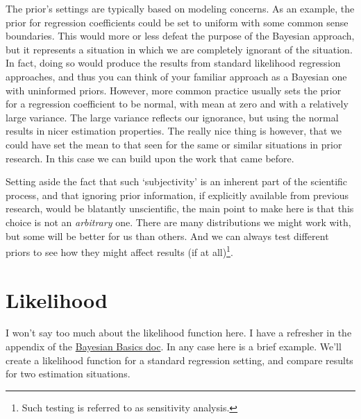 \documentclass[]{book}
\let\rmarkdownfootnote\footnote%
\def\footnote{\protect\rmarkdownfootnote}
\begin{document}
The prior's settings are typically based on modeling concerns. As an
example, the prior for regression coefficients could be set to uniform
with some common sense boundaries. This would more or less defeat the
purpose of the Bayesian approach, but it represents a situation in which
we are completely ignorant of the situation. In fact, doing so would
produce the results from standard likelihood regression approaches, and
thus you can think of your familiar approach as a Bayesian one with
uninformed priors. However, more common practice usually sets the prior
for a regression coefficient to be normal, with mean at zero and with a
relatively large variance. The large variance reflects our ignorance,
but using the normal results in nicer estimation properties. The really
nice thing is however, that we could have set the mean to that seen for
the same or similar situations in prior research. In this case we can
build upon the work that came before.

Setting aside the fact that such `subjectivity' is an inherent part of
the scientific process, and that ignoring prior information, if
explicitly available from previous research, would be blatantly
unscientific, the main point to make here is that this choice is not an
\emph{arbitrary} one. There are many distributions we might work with,
but some will be better for us than others. And we can always test
different priors to see how they might affect results (if at
all)\footnote{Such testing is referred to as sensitivity analysis.}.

\section{Likelihood}\label{likelihood}

I won't say too much about the {likelihood function} here. I have a
refresher in the appendix of the
\href{http://m-clark.github.io/docs/IntroBayes.html}{Bayesian Basics
doc}. In any case here is a brief example. We'll create a likelihood
function for a standard regression setting, and compare results for two
estimation situations.
\end{document}
